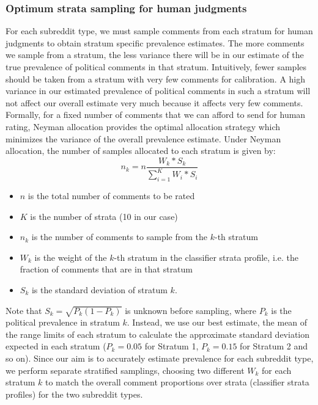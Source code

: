 \documentclass[letterpaper]{article} %
\begin{document}
\subsubsection{Optimum strata sampling for human judgments}
For each subreddit type, we must sample comments from each stratum for human judgments to obtain stratum specific prevalence estimates. The more comments we sample from a stratum, the less variance there will be in our estimate of the true prevalence of political comments in that stratum. 
Intuitively, fewer samples should be taken from a stratum with very few comments for calibration. A high variance in our estimated prevalence of political comments in such a stratum will not affect our overall estimate very much because it affects very few comments.
Formally, for a fixed number of comments that we can afford to send for human rating, Neyman allocation provides the optimal allocation strategy which minimizes the variance of the overall prevalence estimate. Under Neyman allocation, the number of samples allocated to each stratum is given by:
 \begin{displaymath}
n_k = n\frac{W_k * S_k}{\sum_{i=1}^{K}W_i * S_i}
\end{displaymath}
\begin{itemize}
    \item $n$ is the total number of comments to be rated
    \item $K$ is the number of strata (10 in our case)
    \item $n_k$ is the number of comments to sample from the $k$-th stratum
    \item $W_k$ is the weight of the $k$-th stratum in the classifier strata profile, i.e. the fraction of comments that are in that stratum
    \item $S_k$ is the standard deviation of stratum $k$.
\end{itemize}
Note that $S_k = \sqrt{P_k(1-P_k)}$ is unknown before sampling, where $P_k$ is the political prevalence in stratum $k$. Instead, we use our best estimate, the mean of the range limits of each stratum to calculate the approximate standard deviation expected in each stratum ($P_k = 0.05$ for Stratum 1, $P_k = 0.15$ for Stratum 2 and so on). Since our aim is to accurately estimate prevalence for each subreddit type, we perform separate stratified samplings, choosing two different $W_k$ for each stratum $k$ to match the overall comment proportions over strata (classifier strata profiles) for the two subreddit types.
\end{document}
